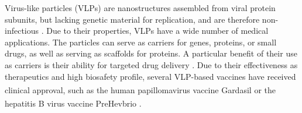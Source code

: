 

Virus-like particles (VLPs) are nanostructures assembled from viral protein subunits, but lacking genetic material for replication, and are therefore non-infectious \cite{vlps_def}. Due to their properties, VLPs have a wide number of medical applications. The particles can serve as carriers for genes, proteins, or small drugs, as well as serving as scaffolds for proteins. A particular benefit of their use as carriers is their ability for targeted drug delivery \cite{vlps_review}. Due to their effectiveness as therapeutics and high biosafety profile, several VLP-based vaccines have received clinical approval, such as the human papillomavirus vaccine Gardasil\textsuperscript{\textregistered} or the hepatitis B virus vaccine PreHevbrio\textsuperscript{\textregistered} \cite{vlps_clinically_approved}.

